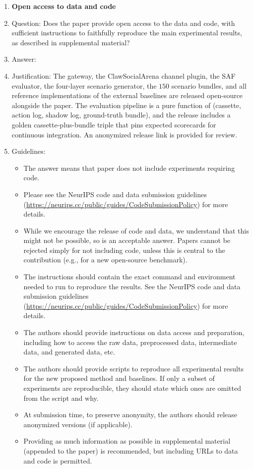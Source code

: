 \begin{enumerate}
\item {\bf Open access to data and code}
    \item[] Question: Does the paper provide open access to the data and code, with sufficient instructions to faithfully reproduce the main experimental results, as described in supplemental material?
    \item[] Answer: \answerYes{}
    \item[] Justification: The gateway, the ClawSocialArena channel plugin, the SAF evaluator, the four-layer scenario generator, the $150$ scenario bundles, and all reference implementations of the external baselines are released open-source alongside the paper. The evaluation pipeline is a pure function of (cassette, action log, shadow log, ground-truth bundle), and the release includes a golden cassette-plus-bundle triple that pins expected scorecards for continuous integration. An anonymized release link is provided for review.
    \item[] Guidelines:
    \begin{itemize}
        \item The answer \answerNA{} means that paper does not include experiments requiring code.
        \item Please see the NeurIPS code and data submission guidelines (\url{https://neurips.cc/public/guides/CodeSubmissionPolicy}) for more details.
        \item While we encourage the release of code and data, we understand that this might not be possible, so \answerNo{} is an acceptable answer. Papers cannot be rejected simply for not including code, unless this is central to the contribution (e.g., for a new open-source benchmark).
        \item The instructions should contain the exact command and environment needed to run to reproduce the results. See the NeurIPS code and data submission guidelines (\url{https://neurips.cc/public/guides/CodeSubmissionPolicy}) for more details.
        \item The authors should provide instructions on data access and preparation, including how to access the raw data, preprocessed data, intermediate data, and generated data, etc.
        \item The authors should provide scripts to reproduce all experimental results for the new proposed method and baselines. If only a subset of experiments are reproducible, they should state which ones are omitted from the script and why.
        \item At submission time, to preserve anonymity, the authors should release anonymized versions (if applicable).
        \item Providing as much information as possible in supplemental material (appended to the paper) is recommended, but including URLs to data and code is permitted.
    \end{itemize}



\end{enumerate}

